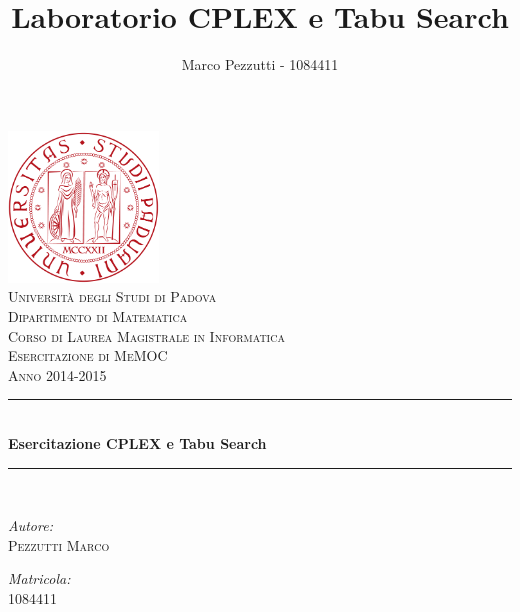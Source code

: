 \documentclass[11pt,a4paper,final]{article}
\author{Marco Pezzutti - 1084411}
\title{Laboratorio CPLEX e Tabu Search}
\date{}
\begin{document}
\begin{titlepage}
\begin{center}
\includegraphics[width=40mm]{immagini/Logo_Padova.png}\\[1cm]
\textcolor{redUni}{\textsc{\LARGE Università degli Studi di Padova}}\\[0.5cm]
\textcolor{redUni}{\textsc{\Large Dipartimento di Matematica}}\\[0.5cm]
\textcolor{redUni}{\textsc{\Large Corso di Laurea Magistrale in Informatica}}\\[2cm]
\textsc{\Large Esercitazione di MeMOC}\\[0.5cm]
\textsc{\large Anno 2014-2015} \\[1cm]
\rule{\linewidth}{0.3mm}\\[0.5cm]
{\huge \bfseries Esercitazione CPLEX e Tabu Search}\\[0.3cm]
\rule{\linewidth}{0.3mm}\\[1cm]
\begin{minipage}{0.4\textwidth}
	\begin{flushleft}
	\emph{Autore:}\\
	\textsc{\large Pezzutti Marco}\\
	\end{flushleft}
\end{minipage}
\begin{minipage}{0.4\textwidth}
	\begin{flushright}
	\emph{Matricola:}\\
	\textsc{\large 1084411}\\
	\end{flushright}
\end{minipage}
\end{center}
\end{titlepage}

\tableofcontents
\listoffigures
\listoftables
\newpage







\end{document}

